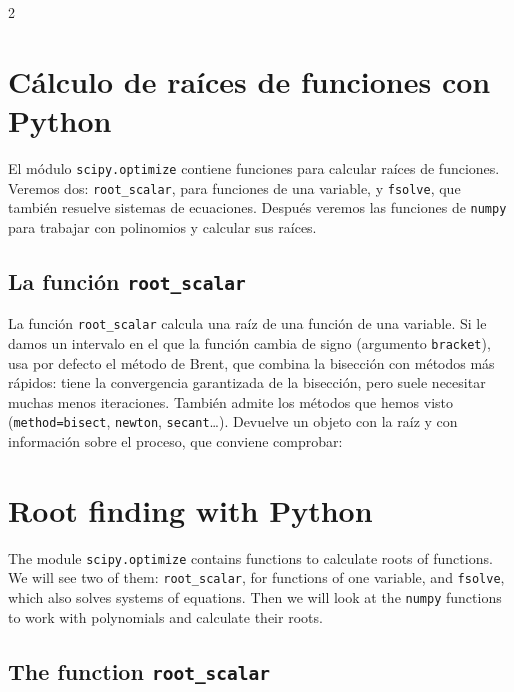 \begin{paracol}{2}

\section[Cálculo de raíces de funciones con Python]{Cálculo de raíces de funciones con Python}\label{sec:raices_python}

El módulo \texttt{scipy.optimize} contiene funciones para calcular raíces de funciones. Veremos dos: \texttt{root\_scalar}, para funciones de una variable, y \texttt{fsolve}, que también resuelve sistemas de ecuaciones. Después veremos las funciones de \texttt{numpy} para trabajar con polinomios y calcular sus raíces.

\subsection{La función \texttt{root\_scalar}}

La función \texttt{root\_scalar} calcula una raíz de una función de una variable. Si le damos un intervalo en el que la función cambia de signo (argumento \texttt{bracket}), usa por defecto el método de Brent, que combina la bisección con métodos más rápidos: tiene la convergencia garantizada de la bisección, pero suele necesitar muchas menos iteraciones. También admite los métodos que hemos visto (\texttt{method=\textquotesingle{}bisect\textquotesingle{}}, \texttt{\textquotesingle{}newton\textquotesingle{}}, \texttt{\textquotesingle{}secant\textquotesingle{}}\ldots). Devuelve un objeto con la raíz y con información sobre el proceso, que conviene comprobar:
\switchcolumn

\section[Root finding with Python]{Root finding with Python}\label{sec:raices_python-2}

The module \texttt{scipy.optimize} contains functions to calculate roots of functions. We will see two of them: \texttt{root\_scalar}, for functions of one variable, and \texttt{fsolve}, which also solves systems of equations. Then we will look at the \texttt{numpy} functions to work with polynomials and calculate their roots.

\subsection{The function \texttt{root\_scalar}}


\end{paracol}
